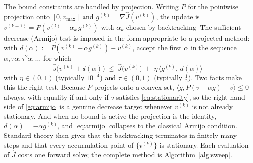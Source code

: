 \documentclass[11pt]{article}
\begin{document}
The bound constraints are handled by projection. Writing $P$ for the pointwise projection onto $[0,v_{\max}]$ and $g^{(k)} = \nabla\hat J(v^{(k)})$, the update is $v^{(k+1)} = P(v^{(k)} - \alpha_k\,g^{(k)})$ with $\alpha_k$ chosen by backtracking. The sufficient-decrease (Armijo) test is imposed in the form appropriate to a projected method: with $d(\alpha) := P(v^{(k)}-\alpha g^{(k)}) - v^{(k)}$, accept the first $\alpha$ in the sequence $\alpha,\tau\alpha,\tau^2\alpha,\dots$ for which
\begin{equation}
\boxed{\;\hat J\big(v^{(k)} + d(\alpha)\big) \;\le\; \hat J\big(v^{(k)}\big) \;+\; \eta\,\big\langle g^{(k)},\,d(\alpha)\big\rangle\;}
\label{eq:armijo}
\end{equation}
with $\eta\in(0,1)$ (typically $10^{-4}$) and $\tau\in(0,1)$ (typically $\tfrac12$). Two facts make this the right test. Because $P$ projects onto a convex set, $\langle g, P(v-\alpha g)-v\rangle \le 0$ always, with equality if and only if $v$ satisfies \eqref{eq:stationarity}, so the right-hand side of \eqref{eq:armijo} is a genuine decrease target whenever $v^{(k)}$ is not already stationary. And when no bound is active the projection is the identity, $d(\alpha) = -\alpha g^{(k)}$, and \eqref{eq:armijo} collapses to the classical Armijo condition. Standard theory \citep{Nocedal2006} then gives that the backtracking terminates in finitely many steps and that every accumulation point of $\{v^{(k)}\}$ is stationary. Each evaluation of $\hat J$ costs one forward solve; the complete method is Algorithm~\ref{alg:sweep}.
\end{document}
